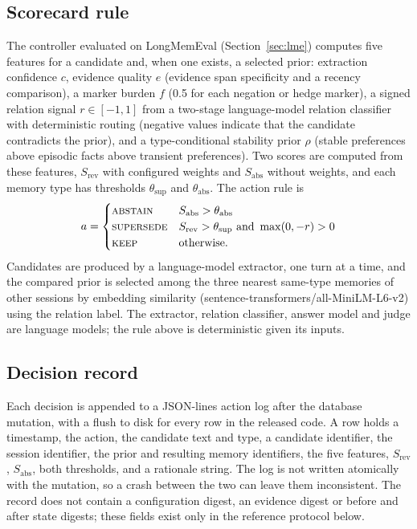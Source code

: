 \subsection{Scorecard rule}
The controller evaluated on LongMemEval (Section~\ref{sec:lme}) computes five features for a candidate and, when one exists, a selected prior: extraction confidence $c$, evidence quality $e$ (evidence span specificity and a recency comparison), a marker burden $f$ (0.5 for each negation or hedge marker), a signed relation signal $r\in[-1,1]$ from a two-stage language-model relation classifier with deterministic routing (negative values indicate that the candidate contradicts the prior), and a type-conditional stability prior $\rho$ (stable preferences above episodic facts above transient preferences). Two scores are computed from these features, $S_\mathrm{rev}$ with configured weights and $S_\mathrm{abs}$ without weights, and each memory type has thresholds $\theta_\mathrm{sup}$ and $\theta_\mathrm{abs}$. The action rule is
\[
a=\begin{cases}
\abstain & S_\mathrm{abs}>\theta_\mathrm{abs}\\
\supersede & S_\mathrm{rev}>\theta_\mathrm{sup}\ \text{and}\ \max(0,-r)>0\\
\keep & \text{otherwise.}
\end{cases}
\]
Candidates are produced by a language-model extractor, one turn at a time, and the compared prior is selected among the three nearest same-type memories of other sessions by embedding similarity (sentence-transformers/all-MiniLM-L6-v2) using the relation label. The extractor, relation classifier, answer model and judge are language models; the rule above is deterministic given its inputs.

\subsection{Decision record}
Each decision is appended to a JSON-lines action log after the database mutation, with a flush to disk for every row in the released code. A row holds a timestamp, the action, the candidate text and type, a candidate identifier, the session identifier, the prior and resulting memory identifiers, the five features, $S_\mathrm{rev}$, $S_\mathrm{abs}$, both thresholds, and a rationale string. The log is not written atomically with the mutation, so a crash between the two can leave them inconsistent. The record does not contain a configuration digest, an evidence digest or before and after state digests; these fields exist only in the reference protocol below.

